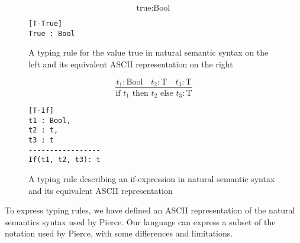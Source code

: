 \documentclass[nofilelist]{cslthse-msc}
\begin{document}
\begin{figure}[h]
\centering
\begin{minipage}{.45\textwidth}
  \centering
  \begin{equation}
    \tag{T-True}
    \text{true} : \text{Bool}
  \end{equation}
\end{minipage}%
\hspace{.1\textwidth}\begin{minipage}{.45\textwidth}
  \centering
\begin{lstlisting}[]
[T-True]
True : Bool
\end{lstlisting}
\end{minipage}
\caption{A typing rule for the value true in natural semantic syntax on the left and its equivalent ASCII representation on the right}
\label{trexampletrue}
\end{figure}
\begin{figure}[h]
\centering
\begin{minipage}{.45\textwidth}
  \centering
  \begin{equation}
    \tag{T-If}
    \frac{
      t_1 : \text{Bool}\quad
      t_2 : \text{T}\quad
      t_3 : \text{T}
    }{
      \text{if } t_1 \text{ then } t_2 \text{ else } t_3 : \text{T}
    }
  \end{equation}
\end{minipage}%
\hspace{.1\textwidth}\begin{minipage}{.45\textwidth}
  \centering
\begin{lstlisting}[]
[T-If]
t1 : Bool,
t2 : t,
t3 : t
-----------------
If(t1, t2, t3): t
\end{lstlisting}
\end{minipage}
\caption{A typing rule describing an if-expression in natural semantic syntax and its equivalent ASCII representation}
\label{trexampleif}
\end{figure}


To express typing rules, we have defined an ASCII representation of the natural semantics syntax used by Pierce\cite{pierce}.
Our language can express a subset of the notation used by Pierce, with some differences and limitations.
\end{document}
